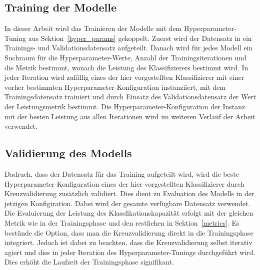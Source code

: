 \subsection*{Training der Modelle}
In dieser Arbeit wird das Trainieren der Modelle mit dem Hyperparameter-Tuning aus Sektion~\ref{hyper_params} gekoppelt. Zuerst wird der Datensatz in ein Trainings- und Validationsdatensatz aufgeteilt. Danach wird für jedes Modell ein Suchraum für die Hyperparameter-Werte, Anzahl der Trainingsiterationen und die Metrik bestimmt, wonach die Leistung des Klassifizierers
bestimmt wird. In jeder Iteration wird zufällig eines der hier vorgestellten Klassifizierer mit einer vorher bestimmten Hyperparameter-Konfiguration instanziiert, mit dem Trainingsdatensatz trainiert und durch Einsatz des Validationsdatensatz der Wert der Leistungsmetrik bestimmt. Die Hyperparameter-Konfiguration der Instanz mit der besten Leistung aus allen Iterationen wird im weiteren Verlauf der Arbeit verwendet.

\subsection*{Validierung des Modells}
Dadruch, dass der Datensatz für das Training aufgeteilt wird, wird die beste Hyperparameter-Konfiguration eines der hier vorgestellten Klassifizierer durch Kreuzvalidierung zusätzlich validiert. Dies dient zu Evaluation des Modells in der jetzigen Konfigiration.
Dabei wird der gesamte verfügbare Datensatz verwendet. Die Evaluierung der Leistung des Klassfikationskapazität erfolgt mit der gleichen Metrik wie in der Trainingsphase und den restlichen in Sektion~\ref{metrics}. Es bestünde die Option, dass man die Kreuzvalidierung direkt in die Trainingsphase integriert. 
Jedoch ist dabei zu beachten, dass die Kreuzvalidierung selbst iterativ agiert und dies in jeder Iteration des Hyperparameter-Tunings durchgeführt wird. Dies erhöht die Laufzeit der Trainingsphase signifikant.


